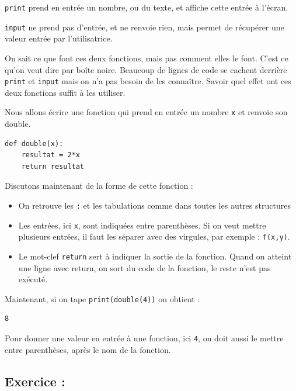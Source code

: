 \documentclass[a4paper,french,11pt]{article}
\begin{document}
\texttt{print} prend en entrée un nombre, ou du texte, et
affiche cette entrée à l'écran.

\texttt{input} ne prend pas d'entrée, et ne renvoie rien,
mais permet de récupérer une valeur entrée par l'utilisatrice.

On sait ce que font ces deux fonctions, mais pas comment elles le font.
C'est ce qu'on veut dire par boîte noire. Beaucoup de lignes de code se
cachent derrière \texttt{print} et
\texttt{input} mais on n'a pas besoin de les connaître.
Savoir quel effet ont ces deux fonctions suffit à les utiliser.

Nous allons écrire une fonction qui prend en entrée un nombre
\texttt{x} et renvoie son double.

\begin{verbatim}
def double(x):
    resultat = 2*x
    return resultat
\end{verbatim}

Discutons maintenant de la forme de cette fonction :

\begin{itemize}
\item
  On retrouve les \texttt{:} et les tabulations comme dans
  toutes les autres structures
\item
  Les entrées, ici \texttt{x}, sont indiquées entre
  parenthèses. Si on veut mettre plusieurs entrées, il faut les séparer
  avec des virgules, par exemple : \texttt{f(x,y)}.
\item
  Le mot-clef \texttt{return} sert à indiquer la sortie de
  la fonction. Quand on atteint une ligne avec return, on sort du code
  de la fonction, le reste n'est pas exécuté.
\end{itemize}

Maintenant, si on tape \texttt{print(double(4))} on obtient
:

\begin{verbatim}
8
\end{verbatim}

Pour donner une valeur en entrée à une fonction, ici
\texttt{4}, on doit aussi le mettre entre parenthèses, après
le nom de la fonction.

\hypertarget{exercice-20}{%
\subsection{Exercice :}\label{exercice-20}}
\end{document}
